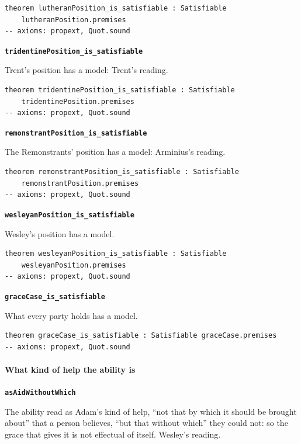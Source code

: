 \documentclass[11pt]{article}
\begin{document}
{\small\begin{verbatim}
theorem lutheranPosition_is_satisfiable : Satisfiable
    lutheranPosition.premises
-- axioms: propext, Quot.sound
\end{verbatim}}
\par\medskip\noindent\textbf{\texttt{tridentine\allowbreak{}Position\_\allowbreak{}is\_\allowbreak{}satisfiable}}\par\nobreak\noindent
Trent’s position has a model: Trent’s reading.

{\small\begin{verbatim}
theorem tridentinePosition_is_satisfiable : Satisfiable
    tridentinePosition.premises
-- axioms: propext, Quot.sound
\end{verbatim}}
\par\medskip\noindent\textbf{\texttt{remonstrant\allowbreak{}Position\_\allowbreak{}is\_\allowbreak{}satisfiable}}\par\nobreak\noindent
The Remonstrants’ position has a model: Arminius’s reading.

{\small\begin{verbatim}
theorem remonstrantPosition_is_satisfiable : Satisfiable
    remonstrantPosition.premises
-- axioms: propext, Quot.sound
\end{verbatim}}
\par\medskip\noindent\textbf{\texttt{wesleyan\allowbreak{}Position\_\allowbreak{}is\_\allowbreak{}satisfiable}}\par\nobreak\noindent
Wesley’s position has a model.

{\small\begin{verbatim}
theorem wesleyanPosition_is_satisfiable : Satisfiable
    wesleyanPosition.premises
-- axioms: propext, Quot.sound
\end{verbatim}}
\par\medskip\noindent\textbf{\texttt{grace\allowbreak{}Case\_\allowbreak{}is\_\allowbreak{}satisfiable}}\par\nobreak\noindent
What every party holds has a model.

{\small\begin{verbatim}
theorem graceCase_is_satisfiable : Satisfiable graceCase.premises
-- axioms: propext, Quot.sound
\end{verbatim}}
\paragraph*{What kind of help the ability is}
\leavevmode\par\nobreak
\par\medskip\noindent\textbf{\texttt{as\allowbreak{}Aid\allowbreak{}Without\allowbreak{}Which}}\par\nobreak\noindent
The ability read as Adam’s kind of help, “not that by which it should be brought about” that a person believes, “but that without which” they could not: so the grace that gives it is not effectual of itself. Wesley’s reading.
\end{document}
